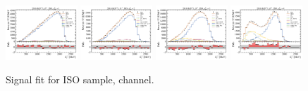 \begin{figure}[htb]
    \includegraphics[width=0.24\textwidth]{./figs-fit-fit-results/sig-fit/lines_q2_slices/fit_result-lines_q2_idx1-Dst-iso-el.pdf}
    \includegraphics[width=0.24\textwidth]{./figs-fit-fit-results/sig-fit/lines_q2_slices/fit_result-lines_q2_idx2-Dst-iso-el.pdf}
    \includegraphics[width=0.24\textwidth]{./figs-fit-fit-results/sig-fit/lines_q2_slices/fit_result-lines_q2_idx3-Dst-iso-el.pdf}
    \includegraphics[width=0.24\textwidth]{./figs-fit-fit-results/sig-fit/lines_q2_slices/fit_result-lines_q2_idx4-Dst-iso-el.pdf}

    \caption{Signal fit for ISO sample, \Dstar channel.}
    \label{fig:sig-dst}
\end{figure}
